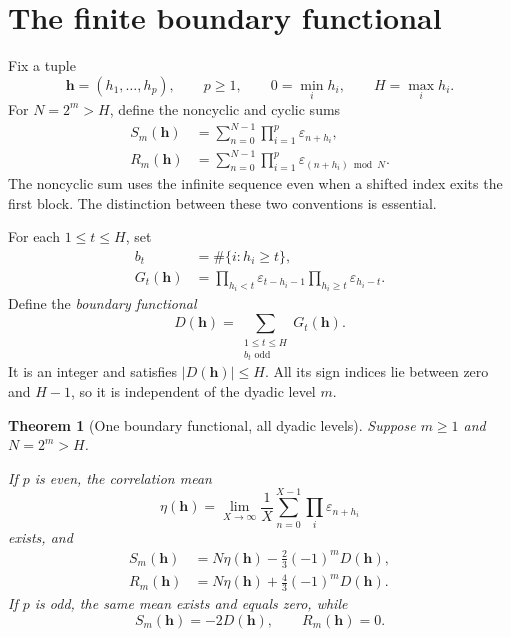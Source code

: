 \documentclass[11pt,a4paper,oneside,openany]{book}
\numberwithin{equation}{chapter}
\newtheorem{theorem}{Theorem}[chapter]
\theoremstyle{definition}
\theoremstyle{remark}
\newcommand{\eps}{\varepsilon}
\begin{document}
\section{The finite boundary functional}
Fix a tuple
\[
 \bm h=(h_1,\ldots,h_p),\qquad p\ge1,\qquad
 0=\min_i h_i,\qquad H=\max_i h_i.
\]
For \(N=2^m>H\), define the noncyclic and cyclic sums
\begin{align}
 S_m(\bm h)&=\sum_{n=0}^{N-1}\prod_{i=1}^p\eps_{n+h_i},
 \label{nd:eq:Sm}\\
 R_m(\bm h)&=\sum_{n=0}^{N-1}\prod_{i=1}^p
                 \eps_{(n+h_i)\bmod N}.
 \label{nd:eq:Rm}
\end{align}
The noncyclic sum uses the infinite sequence even when a shifted index exits
the first block. The distinction between these two conventions is essential.

For each \(1\le t\le H\), set
\begin{align}
 b_t&=\#\{i:h_i\ge t\},\\
 G_t(\bm h)&=
 \prod_{h_i<t}\eps_{t-h_i-1}
 \prod_{h_i\ge t}\eps_{h_i-t}.
 \label{nd:eq:Gt}
\end{align}
Define the \emph{boundary functional}
\begin{equation}
 D(\bm h)=\sum_{\substack{1\le t\le H\\b_t\text{ odd}}}G_t(\bm h).
 \label{nd:eq:defect}
\end{equation}
It is an integer and satisfies \(|D(\bm h)|\le H\). All its sign indices lie
between zero and \(H-1\), so it is independent of the dyadic level \(m\).

\begin{theorem}[One boundary functional, all dyadic levels]
\label{nd:thm:boundary}
Suppose \(m\ge1\) and \(N=2^m>H\).

If \(p\) is even, the correlation mean
\begin{equation}
 \eta(\bm h)=\lim_{X\to\infty}\frac1X
       \sum_{n=0}^{X-1}\prod_i\eps_{n+h_i}
 \label{nd:eq:eta}
\end{equation}
exists, and
\begin{align}
 S_m(\bm h)&=N\eta(\bm h)-\frac23(-1)^mD(\bm h),
 \label{nd:eq:evenS}\\
 R_m(\bm h)&=N\eta(\bm h)+\frac43(-1)^mD(\bm h).
 \label{nd:eq:evenR}
\end{align}
If \(p\) is odd, the same mean exists and equals zero, while
\begin{equation}
 S_m(\bm h)=-2D(\bm h),\qquad R_m(\bm h)=0.
 \label{nd:eq:oddS}
\end{equation}
\end{theorem}
\end{document}
